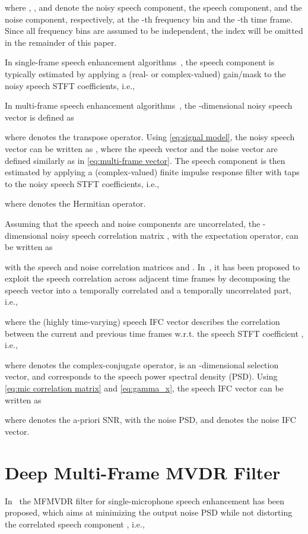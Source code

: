 \documentclass{article}
\begin{document}
where , , and  denote the noisy speech component, the speech component, and the noise component, respectively, at the -th frequency bin and the -th time frame. 
Since all frequency bins are assumed to be independent, the index  will be omitted in the remainder of this paper.

In single-frame speech enhancement algorithms~\cite{vary_digital_2006,hendriks_dft-domain_2013,ephraim_speech_1984,gerkmann_phase_2015,wang_training_2014,kolbaek_speech_2017,luo_conv-tasnet_2019,tan_gated_2019}, the speech component  is typically estimated by applying a (real- or complex-valued) gain/mask  to the noisy speech STFT coefficients, i.e.,

In multi-frame speech enhancement algorithms~\cite{benesty_speech_2011}, the -dimensional noisy speech vector  is defined as

where  denotes the transpose operator.
Using \eqref{eq:signal model}, the noisy speech vector  can be written as , where the speech vector  and the noise vector  are defined similarly as  in \eqref{eq:multi-frame vector}.
The speech component  is then estimated by applying a (complex-valued) finite impulse response filter  with  taps to the noisy speech STFT coefficients, i.e.,

where  denotes the Hermitian operator.

Assuming that the speech and noise components are uncorrelated, the -dimensional noisy speech correlation matrix , with  the expectation operator, can be written as

with the speech and noise correlation matrices  and .
In~\cite{huang_multi-frame_2012}, it has been proposed to exploit the speech correlation across adjacent time frames by decomposing the speech vector into a temporally correlated and a temporally uncorrelated part, i.e.,

where the (highly time-varying) speech IFC vector  describes the correlation between the current and previous time frames w.r.t. the speech STFT coefficient , i.e.,

where  denotes the complex-conjugate operator,  is an -dimensional selection vector, and  corresponds to the speech power spectral density (PSD).
Using \eqref{eq:mic correlation matrix} and \eqref{eq:gamma_x}, the speech IFC vector  can be written as

where  denotes the a-priori SNR, with  the noise PSD, and  denotes the noise IFC vector.

\section{Deep Multi-Frame MVDR Filter}
In~\cite{huang_multi-frame_2012,benesty_speech_2011} the MFMVDR filter for single-microphone speech enhancement has been proposed, which aims at minimizing the output noise PSD while not distorting the correlated speech component , i.e.,
\end{document}
